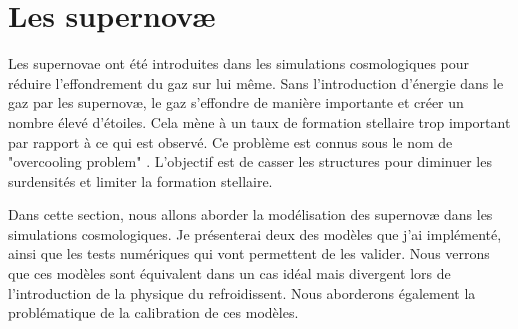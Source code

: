 \clearpage
\section{Les supernovæ}



Les supernovae ont été introduites dans les simulations cosmologiques pour réduire l'effondrement du gaz sur lui même.
Sans l'introduction d'énergie dans le gaz par les supernovæ, le gaz s'effondre de manière importante et créer un nombre élevé d'étoiles.
Cela mène à un taux de formation stellaire trop important par rapport à ce qui est observé.
Ce problème est connus sous le nom de "overcooling problem" \citep{2003ApJ...599...38B, 1992A&A...264..365B}.
L'objectif est de casser les structures pour diminuer les surdensités et limiter la formation stellaire.

Dans cette section, nous allons aborder la modélisation des supernovæ dans les simulations cosmologiques.
Je présenterai deux des modèles que j'ai implémenté, ainsi que les tests numériques qui vont permettent de les valider.
Nous verrons que ces modèles sont équivalent dans un cas idéal mais divergent lors de l'introduction de la physique du refroidissent.
Nous aborderons également la problématique de la calibration de ces modèles.


%
%


